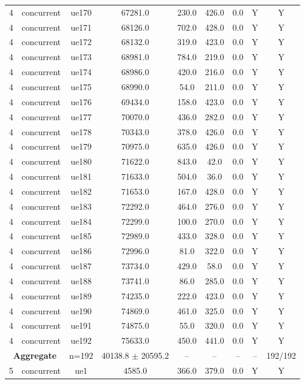 \begin{table}[ht]
\begin{tabular}{|c|c|c|c|c|c|c|c|c|}
4 & concurrent & ue170 & 67281.0 & 230.0 & 426.0 & 0.0 & Y & Y \\
4 & concurrent & ue171 & 68126.0 & 702.0 & 428.0 & 0.0 & Y & Y \\
4 & concurrent & ue172 & 68132.0 & 319.0 & 423.0 & 0.0 & Y & Y \\
4 & concurrent & ue173 & 68981.0 & 784.0 & 219.0 & 0.0 & Y & Y \\
4 & concurrent & ue174 & 68986.0 & 420.0 & 216.0 & 0.0 & Y & Y \\
4 & concurrent & ue175 & 68990.0 & 54.0 & 211.0 & 0.0 & Y & Y \\
4 & concurrent & ue176 & 69434.0 & 158.0 & 423.0 & 0.0 & Y & Y \\
4 & concurrent & ue177 & 70070.0 & 436.0 & 282.0 & 0.0 & Y & Y \\
4 & concurrent & ue178 & 70343.0 & 378.0 & 426.0 & 0.0 & Y & Y \\
4 & concurrent & ue179 & 70975.0 & 635.0 & 426.0 & 0.0 & Y & Y \\
4 & concurrent & ue180 & 71622.0 & 843.0 & 42.0 & 0.0 & Y & Y \\
4 & concurrent & ue181 & 71633.0 & 504.0 & 36.0 & 0.0 & Y & Y \\
4 & concurrent & ue182 & 71653.0 & 167.0 & 428.0 & 0.0 & Y & Y \\
4 & concurrent & ue183 & 72292.0 & 464.0 & 276.0 & 0.0 & Y & Y \\
4 & concurrent & ue184 & 72299.0 & 100.0 & 270.0 & 0.0 & Y & Y \\
4 & concurrent & ue185 & 72989.0 & 433.0 & 328.0 & 0.0 & Y & Y \\
4 & concurrent & ue186 & 72996.0 & 81.0 & 322.0 & 0.0 & Y & Y \\
4 & concurrent & ue187 & 73734.0 & 429.0 & 58.0 & 0.0 & Y & Y \\
4 & concurrent & ue188 & 73741.0 & 86.0 & 285.0 & 0.0 & Y & Y \\
4 & concurrent & ue189 & 74235.0 & 222.0 & 423.0 & 0.0 & Y & Y \\
4 & concurrent & ue190 & 74869.0 & 461.0 & 325.0 & 0.0 & Y & Y \\
4 & concurrent & ue191 & 74875.0 & 55.0 & 320.0 & 0.0 & Y & Y \\
4 & concurrent & ue192 & 75633.0 & 450.0 & 441.0 & 0.0 & Y & Y \\
\multicolumn{2}{|c|}{\textbf{Aggregate}} & n=192 & 40138.8 $\pm$ 20595.2 & -- & -- & -- & -- & 192/192 \\
\hline
5 & concurrent & ue1 & 4585.0 & 366.0 & 379.0 & 0.0 & Y & Y \\

\end{tabular}
\end{table}
